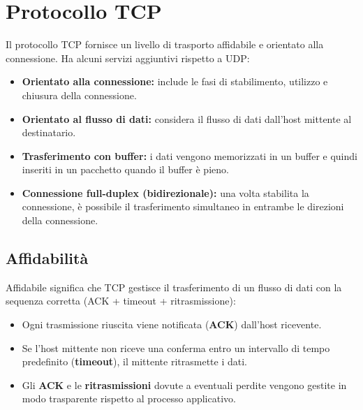 \section{Protocollo TCP}
Il protocollo TCP fornisce un livello di trasporto affidabile e orientato alla connessione. Ha alcuni servizi aggiuntivi rispetto a UDP:
\begin{itemize}
    \item \textbf{Orientato alla connessione:} include le fasi di  stabilimento, utilizzo e chiusura della connessione.
    \item \textbf{Orientato al flusso di dati:} considera il flusso di dati dall'host mittente al destinatario.
    \item \textbf{Trasferimento con buffer:} i dati vengono memorizzati in un buffer e quindi inseriti in un pacchetto quando il buffer è pieno.
    \item \textbf{Connessione full-duplex (bidirezionale):} una volta stabilita la connessione, è possibile il trasferimento simultaneo in entrambe le direzioni della connessione.
\end{itemize}

\subsection{Affidabilità}
Affidabile significa che TCP gestisce il trasferimento di un flusso di dati con la sequenza corretta (ACK + timeout + ritrasmissione):
\begin{itemize}
    \item Ogni trasmissione riuscita viene notificata (\textbf{ACK}) dall'host ricevente.
    \item Se l'host mittente non riceve una conferma entro un intervallo di tempo predefinito (\textbf{timeout}), il mittente ritrasmette i dati.
    \item Gli \textbf{ACK} e le \textbf{ritrasmissioni} dovute a eventuali perdite vengono gestite in modo trasparente rispetto al processo applicativo.
\end{itemize}

